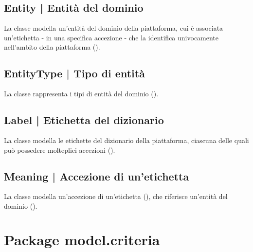 \documentclass[10pt,a4paper,headinclude,footinclude,hidelinks]{scrreprt} %
\begin{document}
	\subsection[Entity]{Entity | Entità del dominio}
	\label{sec:stage:design:model:entity}
	La classe modella un'entità del dominio della piattaforma, cui è associata un'etichetta - in una specifica accezione - che la identifica univocamente nell'ambito della piattaforma (\textit{}).

	\subsection[EntityType]{EntityType | Tipo di entità}
	\label{sec:stage:design:model:entity-type}
	La classe rappresenta i tipi di entità del dominio (\textit{}).

	\subsection[Label]{Label | Etichetta del dizionario}
	\label{sec:stage:design:model:label}
	La classe modella le etichette del dizionario della piattaforma, ciascuna delle quali può possedere molteplici accezioni (\textit{}).

	\subsection[Meaning]{Meaning | Accezione di un'etichetta}
	\label{sec:stage:design:model:meaning}
	La classe modella un'accezione di un'etichetta (\textit{}), che riferisce un'entità del dominio (\textit{}).

	\section{Package model.criteria}
	\label{sec:stage:design:model.criteria}
\end{document}
